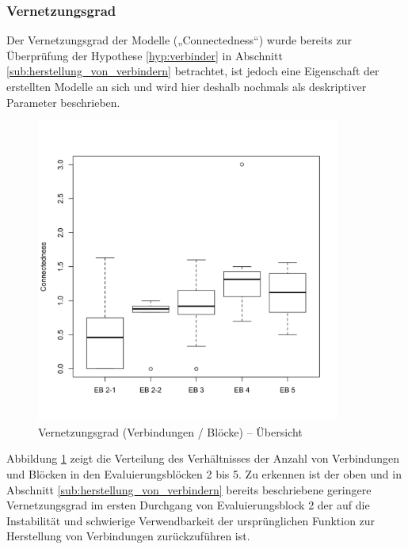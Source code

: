 
\subsubsection{Vernetzungsgrad} %
\label{ssub:vernetzungsgrad}

Der Vernetzungsgrad der Modelle („Connectedness“) wurde bereits zur Überprüfung der Hypothese \ref{hyp:verbinder} in Abschnitt \ref{sub:herstellung_von_verbindern} betrachtet, ist jedoch eine Eigenschaft der erstellten Modelle an sich und wird hier deshalb nochmals als deskriptiver Parameter beschrieben.

\begin{figure}[htbp]
	\centering
		\includegraphics[width=10cm]{img/Evaluierung/connectednessOverviewAll.png}
	\caption{Vernetzungsgrad (Verbindungen / Blöcke) -- Übersicht}
	\label{fig:img_Evaluierung_connectednessOverviewAll}
\end{figure}

Abbildung \ref{fig:img_Evaluierung_connectednessOverviewAll} zeigt die Verteilung des Verhältnisses der Anzahl von Verbindungen und Blöcken in den Evaluierungsblöcken 2 bis 5. Zu erkennen ist der oben und in Abschnitt \ref{sub:herstellung_von_verbindern} bereits beschriebene geringere Vernetzungsgrad im ersten Durchgang von Evaluierungsblock 2 der auf die Instabilität und schwierige Verwendbarkeit der ursprünglichen Funktion zur Herstellung von Verbindungen zurückzuführen ist.

